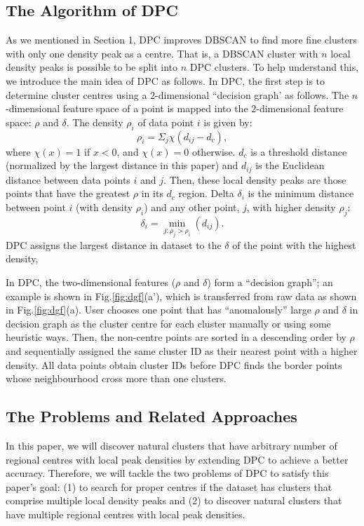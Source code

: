 \documentclass{llncs}
\begin{document}
\subsection{The Algorithm of DPC}
%
As we mentioned in Section 1, DPC improves DBSCAN to find more fine clusters with only one density peak as a centre. That is, a DBSCAN cluster with $n$ local density peaks is possible to be split into $n$ DPC clusters. To help understand this, we introduce the main idea of DPC as follows. 
In DPC, the first step is to determine cluster centres using a $2$-dimensional ``decision graph' as follows. The $n$-dimensional feature space of a point is mapped into the $2$-dimensional feature space: $\rho$ and $\delta$. The density $\rho_{i}$ of data point $i$ is given by:
%
\begin{equation}
\rho_{i} = \Sigma_{j}\chi\left(d_{ij} - d_{c}\right),
\label{rho:normal}
\end{equation}
where $\chi\left(x\right) = 1$ if $x < 0$, and $\chi\left(x\right) = 0$ otherwise. $d_{c}$ is a threshold distance (normalized by the largest distance in this paper) and $d_{ij}$ is the Euclidean distance between data points $i$ and $j$. Then, these local density peaks are those points that have the greatest $\rho$ in its $d_{c}$ region. 
Delta $\delta_{i}$ is the minimum distance between point $i$ (with density $\rho_{i}$) and any other point, $j$, with higher density $\rho_{j}$:
%
\begin{equation}
\delta_{i} = \min_{j:\rho_{j}>\rho_{i}}\left(d_{ij}\right).
\label{delta:normal}
\end{equation}
DPC assigns the largest distance in dataset to the $\delta$ of the point with the highest density, 

In DPC, the two-dimensional features ($\rho$ and $\delta$) form a ``decision graph''; an example is shown in Fig.\ref{fig:dgf}(a'), which is transferred from raw data as shown in Fig.\ref{fig:dgf}(a). User chooses one point that has ``anomalously'' large $\rho$ and $\delta$ in decision graph \cite{dp} as the cluster centre for each cluster manually or using some heuristic ways. Then, the non-centre points are sorted in a descending order by $\rho$ and sequentially assigned the same cluster ID as their nearest point with a higher density. All data points obtain cluster IDs before DPC finds the border points whose neighbourhood cross more than one clusters.
%
\subsection{The Problems and Related Approaches}
In this paper, we will discover natural clusters that have arbitrary number of regional centres with local peak densities by extending DPC to achieve a better accuracy.
Therefore, we will tackle the two problems of DPC to satisfy this paper's goal: (1) to search for proper centres if the dataset has clusters that comprise multiple local density peaks and (2) to discover natural clusters that have multiple regional centres with local peak densities. 
\end{document}
